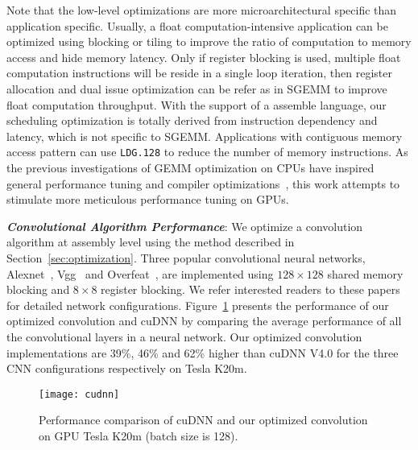 Note that the low-level optimizations are more microarchitectural specific than application specific. 
Usually, a float computation-intensive application can be optimized using
blocking or tiling to improve the ratio of computation to memory access and hide memory latency. 
Only if register blocking is used, multiple float computation instructions will be reside in a single loop iteration, then register allocation and dual issue optimization can be refer as in SGEMM to improve float computation throughput. 
With the support of a assemble language, our scheduling optimization is totally derived from instruction dependency and latency, which is not specific to SGEMM. 
Applications with contiguous memory access pattern can use {\tt LDG.128} to reduce the number of memory instructions.
As the previous investigations of GEMM optimization on CPUs have inspired
general performance tuning and compiler optimizations~\cite{lam1991cache}, this work attempts to stimulate more meticulous performance tuning on GPUs.  

{\em {\bf Convolutional Algorithm Performance}}:
We optimize a convolution algorithm at assembly level using the method described in Section~\ref{sec:optimization}.
Three popular convolutional neural networks, Alexnet~\cite{krizhevsky2012imagenet}, Vgg~\cite{simonyan2014very} and Overfeat~\cite{sermanet2013overfeat}, are implemented using $128\times128$ shared memory blocking and $8\times8$ register blocking. 
We refer interested readers to these papers for detailed network configurations.
Figure~\ref{fig:conv} presents the performance of our optimized convolution and cuDNN by comparing the average performance of all the convolutional layers in a neural network. %
Our optimized convolution implementations are 39\%, 46\% and 62\% higher than cuDNN V4.0 for the three CNN configurations respectively on Tesla K20m.

\begin{figure}[htbp]
\begin{center}
\texttt{[image: cudnn]}
    \caption{Performance comparison of cuDNN and our optimized convolution on GPU Tesla K20m (batch size is 128).}
\label{fig:conv}
\end{center}
\end{figure}
